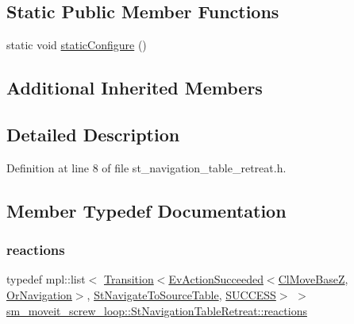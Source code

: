 \subsection*{Static Public Member Functions}
\begin{DoxyCompactItemize}
\item 
static void \hyperlink{structsm__moveit__screw__loop_1_1StNavigationTableRetreat_a44efd3dfb0eed47259e7817d62151e5d}{static\+Configure} ()
\end{DoxyCompactItemize}
\subsection*{Additional Inherited Members}


\subsection{Detailed Description}


Definition at line 8 of file st\+\_\+navigation\+\_\+table\+\_\+retreat.\+h.



\subsection{Member Typedef Documentation}
\mbox{\label{structsm__moveit__screw__loop_1_1StNavigationTableRetreat_a1d3451203ca891f3b92af69a1222d278}} 
\subsubsection{\texorpdfstring{reactions}{reactions}}
{\footnotesize\ttfamily typedef mpl\+::list$<$ \hyperlink{classsmacc_1_1Transition}{Transition}$<$\hyperlink{structsmacc_1_1default__events_1_1EvActionSucceeded}{Ev\+Action\+Succeeded}$<$\hyperlink{classcl__move__base__z_1_1ClMoveBaseZ}{Cl\+Move\+BaseZ}, \hyperlink{classsm__moveit__screw__loop_1_1OrNavigation}{Or\+Navigation}$>$, \hyperlink{structsm__moveit__screw__loop_1_1StNavigateToSourceTable}{St\+Navigate\+To\+Source\+Table}, \hyperlink{structsmacc_1_1default__transition__tags_1_1SUCCESS}{S\+U\+C\+C\+E\+SS}$>$ $>$ \hyperlink{structsm__moveit__screw__loop_1_1StNavigationTableRetreat_a1d3451203ca891f3b92af69a1222d278}{sm\+\_\+moveit\+\_\+screw\+\_\+loop\+::\+St\+Navigation\+Table\+Retreat\+::reactions}}



